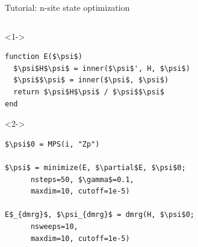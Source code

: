 \begin{frame}[fragile]{Tutorial: n-site state optimization}

\begin{columns}

\begin{column}{5cm}

\begin{onlyenv}<1->
\begin{lstlisting}[language=JuliaLocal, style=julia, mathescape, basicstyle=\scriptsize\ttfamily]
function E($\psi$)
  $\psi$H$\psi$ = inner($\psi$', H, $\psi$)
  $\psi$$\psi$ = inner($\psi$, $\psi$)
  return $\psi$H$\psi$ / $\psi$$\psi$
end
\end{lstlisting}
\end{onlyenv}

\begin{onlyenv}<2->
\begin{lstlisting}[language=JuliaLocal, style=julia, mathescape, basicstyle=\scriptsize\ttfamily]
$\psi$0 = MPS(i, "Zp")

$\psi$ = minimize(E, $\partial$E, $\psi$0;
      nsteps=50, $\gamma$=0.1,
      maxdim=10, cutoff=1e-5)

E$_{dmrg}$, $\psi_{dmrg}$ = dmrg(H, $\psi$0;
      nsweeps=10,
      maxdim=10, cutoff=1e-5)
\end{lstlisting}
\end{onlyenv}

\end{column}

\begin{column}{5.5cm}



\end{column}
\end{columns}
\end{frame}
